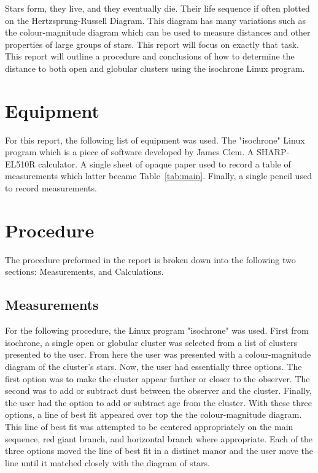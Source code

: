 \documentclass{article}
\begin{document}
Stars form, they live, and they eventually die. Their life sequence if often plotted on the
Hertzsprung-Russell Diagram. This diagram has many variations such as the colour-magnitude
diagram which can be used to measure distances and other properties of large groups of stars.
This report will focus on exactly that task. This report will outline a procedure and
conclusions of how to determine the distance to both open and globular clusters using the
isochrone Linux program.\


\section{Equipment}

For this report, the following list of equipment was used. The "isochrone" Linux program
which is a piece of software developed by James Clem. A SHARP-EL510R calculator.
A single sheet of opaque paper used to record a table of measurements which latter
became Table~\ref{tab:main}. Finally, a single pencil used to record measurements.


\section{Procedure}

The procedure preformed in the report is broken down into the following two sections:
Measurements, and Calculations.

\subsection{Measurements}

For the following procedure, the Linux program "isochrone" was used. First from
isochrone, a single open or globular cluster was selected from a list of clusters
presented to the user. From here the user was presented with a colour-magnitude
diagram of the cluster's stars. Now, the user had essentially three options. The
first option was to make the cluster appear further or closer to the observer. The
second was to add or subtract dust between the observer and the cluster. Finally,
the user had the option to add or subtract age from the cluster. With these three 
options, a line of best fit appeared over top the the colour-magnitude diagram. 
This line of best fit was attempted to be centered appropriately on the main 
sequence, red giant branch, and horizontal branch where appropriate. Each of the
three options moved the line of best fit in a distinct manor and the user
move the line until it matched closely with the diagram of stars.\\
\end{document}
